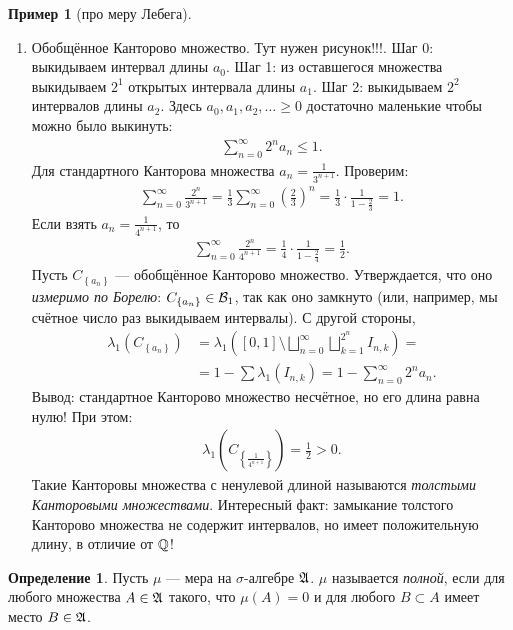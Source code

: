 \documentclass[a4paper,14pt]{extarticle}
\newcounter{theoremCnt}
\theoremstyle{definition}
\newtheorem{df}[theoremCnt]{Определение}
\theoremstyle{plain}
\theoremstyle{plain}
\theoremstyle{plain}
\theoremstyle{plain}
\theoremstyle{definition}
\newtheorem{exmpl}[theoremCnt]{Пример}
\theoremstyle{definition}
\theoremstyle{definition}
\theoremstyle{definition}
\theoremstyle{definition}
\theoremstyle{definition}
\theoremstyle{plain}
\theoremstyle{plain}
\theoremstyle{plain}
\theoremstyle{plain}
\theoremstyle{definition}
\theoremstyle{definition}
\theoremstyle{definition}
\theoremstyle{definition}
\theoremstyle{definition}
\newcommand{\Q}{\ensuremath \mathbb{Q}}
\newcommand{\A}{\ensuremath \mathfrak{A}}
\begin{document}
\begin{exmpl}[про меру Лебега]
\begin{enumerate}
\begin{proof}
\begin{align*}
    .\end{align*}
   \end{proof}
  \item Обобщённое Канторово множество. {\color{red} Тут нужен рисунок!!!}. Шаг 0:  выкидываем интервал длины $a_0$. Шаг 1: из оставшегося множества выкидываем $2^{1}$ открытых интервала длины $a_1$. Шаг 2: выкидываем $2^{2}$ интервалов длины $a_2$. Здесь $a_0, a_1, a_2, \ldots \geqslant 0$ достаточно маленькие чтобы можно было выкинуть:
   \begin{align*}
    \sum_{n=0}^{\infty} 2^{n} a_n \leqslant 1
   .\end{align*} Для стандартного Канторова множества $a_n = \frac{1}{3^{n+1}}$. Проверим:
   \begin{align*}
    \sum_{n=0}^{\infty} \frac{2^{n}}{3^{n+1}} = \frac{1}{3} \sum_{n=0}^{\infty} \left( \frac{2}{3} \right)^{n} = \frac{1}{3} \cdot \frac{1}{1 - \frac{2}{3}} = 1
   .\end{align*} Если взять $a_n = \frac{1}{4^{n+1}}$, то
   \begin{align*}
    \sum_{n=0}^{\infty} \frac{2^{n}}{4^{n+1}} = \frac{1}{4} \cdot \frac{1}{1 - \frac{2}{4}} = \frac{1}{2}
   .\end{align*} Пусть $C_{\left\{ a_n \right\}}$ --- обобщённое Канторово множество. Утверждается, что оно \textit{измеримо по Борелю}: $C_{\left\{ a_n \right\}} \in \mathcal{B}_1$, так как оно замкнуто (или, например, мы счётное число раз выкидываем интервалы). С другой стороны,
   \begin{align*}
    \lambda_1 \left( C_{\left\{ a_n \right\}} \right)
    & = \lambda_{1} \left( [0, 1] \setminus \bigsqcup_{n=0}^{\infty} \bigsqcup_{k=1}^{2^{n}} I_{n,k} \right) = \\
    & =  1 - \sum  \lambda_1(I_{n,k}) = 1 - \sum_{n=0}^{\infty} 2^{n} a_n
   .\end{align*} Вывод: стандартное Канторово множество несчётное, но его длина равна нулю! При этом:
   \begin{align*}
    \lambda_1 \left( C_{\left\{ \frac{1}{4^{n+1}} \right\}} \right) = \frac{1}{2} > 0
   .\end{align*} Такие Канторовы множества с ненулевой длиной называются \textit{толстыми Канторовыми множествами}. Интересный факт: замыкание толстого Канторово множества не содержит интервалов, но имеет положительную длину, в отличие от $\Q$!
 \end{enumerate}
\end{exmpl}
\begin{df}
 Пусть  $\mu$ --- мера на $\sigma$-алгебре $\A$. $\mu$ называется \textit{полной}, если для любого множества $A \in \A$ такого, что $\mu(A) = 0$ и для любого  $B \subset A$ имеет место $B \in \A$.
\end{df}
\end{document}
